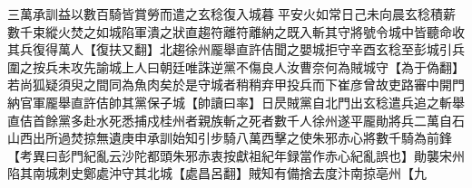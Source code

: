 三萬承訓益以數百騎皆賞勞而遣之玄稔復入城暮平安火如常日己未向晨玄稔積薪數千束縱火焚之如城陷軍潰之狀直趨符離符離納之既入斬其守將號令城中皆聽命收其兵復得萬人【復扶又翻】北趨徐州龎舉直許佶聞之嬰城拒守辛酉玄稔至彭城引兵圍之按兵未攻先諭城上人曰朝廷唯誅逆黨不傷良人汝曹奈何為賊城守【為于偽翻】若尚狐疑須臾之間同為魚肉矣於是守城者稍稍弃甲投兵而下崔彦曾故吏路審中開門納官軍龎舉直許佶帥其黨保子城【帥讀曰率】日昃賊黨自北門出玄稔遣兵追之斬舉直佶首餘黨多赴水死悉捕戍桂州者親族斬之死者數千人徐州遂平龎勛將兵二萬自石山西出所過焚掠無遺庚申承訓始知引步騎八萬西擊之使朱邪赤心將數千騎為前鋒　【考異曰彭門紀亂云沙陀都頭朱邪赤衷按獻祖紀年録當作赤心紀亂誤也】勛襲宋州陷其南城刺史鄭處沖守其北城【處昌呂翻】賊知有備捨去度汴南掠亳州【九